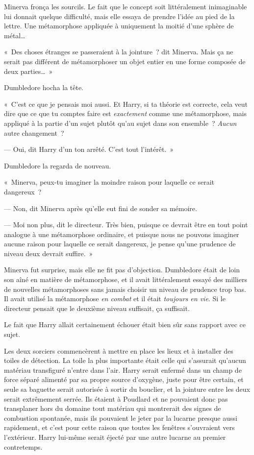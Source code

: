 Minerva fronça les sourcils. Le fait que le concept soit littéralement inimaginable lui donnait quelque difficulté, mais elle essaya de prendre l'idée au pied de la lettre. Une métamorphose appliquée à uniquement la moitié d'une sphère de métal…

«~Des choses étranges se passeraient à la jointure~? dit Minerva. Mais ça ne serait pas différent de métamorphoser un objet entier en une forme composée de deux parties…~»

Dumbledore hocha la tête.

«~C'est ce que je pensais moi aussi. Et Harry, si ta théorie est correcte, cela veut dire que ce que tu comptes faire est \emph{exactement} comme une métamorphose, mais appliqué à la partie d'un sujet plutôt qu'au sujet dans son ensemble~? \emph{Aucun} autre changement~?

--- Oui, dit Harry d'un ton arrêté. C'est tout l'intérêt.~»

Dumbledore la regarda de nouveau.

«~Minerva, peux-tu imaginer la moindre raison pour laquelle ce serait dangereux~?

--- Non, dit Minerva après qu'elle eut fini de sonder sa mémoire.

--- Moi non plus, dit le directeur. Très bien, puisque ce devrait être en tout point analogue à une métamorphose ordinaire, et puisque nous ne pouvons imaginer aucune raison pour laquelle ce serait dangereux, je pense qu'une prudence de niveau deux devrait suffire.~»

Minerva fut surprise, mais elle ne fit pas d'objection. Dumbledore était de loin son aîné en matière de métamorphose, et il avait littéralement essayé des milliers de nouvelles métamorphoses sans jamais choisir un niveau de prudence trop bas. Il avait utilisé la métamorphose \emph{en combat} et il était \emph{toujours en vie}. Si le directeur pensait que le deuxième niveau suffisait, ça suffisait.

Le fait que Harry allait certainement échouer était bien sûr sans rapport avec ce sujet.

Les deux sorciers commencèrent à mettre en place les lieux et à installer des toiles de détection. La toile la plus importante était celle qui s'assurait qu'aucun matériau transfiguré n'entre dans l'air. Harry serait enfermé dans un champ de force séparé alimenté par sa propre source d'oxygène, juste pour être certain, et seule sa baguette serait autorisée à sortir du bouclier, et la jointure entre les deux serait extrêmement serrée. Ils étaient à Poudlard et ne pouvaient donc pas transplaner hors du domaine tout matériau qui montrerait des signes de combustion spontanée, mais ils pouvaient le jeter par la lucarne presque aussi rapidement, et c'est pour cette raison que toutes les fenêtres s'ouvraient vers l'extérieur. Harry lui-même serait éjecté par une autre lucarne au premier contretemps.

